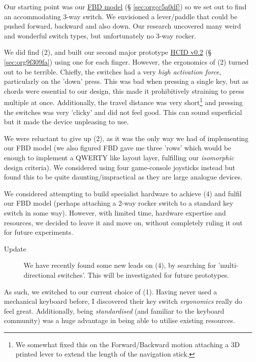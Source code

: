 \documentclass[logo,bsc,singlespacing,parskip]{infthesis}
\begin{document}
Our starting point was our \hyperref[sec:orgcc5a0df]{FBD model} (§ \ref{sec:orgcc5a0df}) so we set out to find an accommodating 3-way switch.
We envisioned a lever/paddle that could be pushed forward, backward and also down.
Our research uncovered many weird and wonderful switch types, but unfortunately no 3-way rocker.

We did find (2), and built our second major prototype \hyperref[sec:org9f309fa]{HCID v0.2} (§ \ref{sec:org9f309fa}) using one for each finger.
However, the ergonomics of (2) turned out to be terrible.
Chiefly, the switches had a very \emph{high activation force}, particularly on the 'down' press.
This was bad  when pressing a single key, but as chords were essential to our design, this made it prohibitively straining to press multiple at once.
Additionally, the travel distance was very short\footnote{We somewhat fixed this on the Forward/Backward motion attaching a 3D printed lever to extend the length of the navigation stick.} and pressing the switches was very 'clicky' and did not feel good.
This can sound superficial but it made the device unpleasing to use.

We were reluctant to give up (2), as it was the only way we had of implementing our FBD model (we also figured FBD gave me three 'rows' which would be enough to implement a QWERTY like layout layer, fulfilling our \emph{isomorphic} design criteria).
We considered using four game-console joysticks instead but found this to be quite daunting/impractical as they are large analogue devices.

We considered attempting to build specialist hardware to achieve (4) and fulfil our FBD model (perhaps attaching a 2-way rocker switch to a standard key switch in some way).
However, with limited time, hardware expertise and resources, we decided to leave it and move on, without completely ruling it out for future experiments. \\

\begin{mdframed}
\begin{description}
\item[{Update}] We have recently found some new leads on (4), by searching for 'multi-directional switches'.
This will be investigated for future prototypes.
\end{description}
\end{mdframed}


As such, we switched to our current choice of (1).
Having never used a mechanical keyboard before, I discovered their key switch \emph{ergonomics} really do feel great.
Additionally, being \emph{standardised} (and familiar to the keyboard community) was a huge advantage in being able to utilise existing resources.
\end{document}
